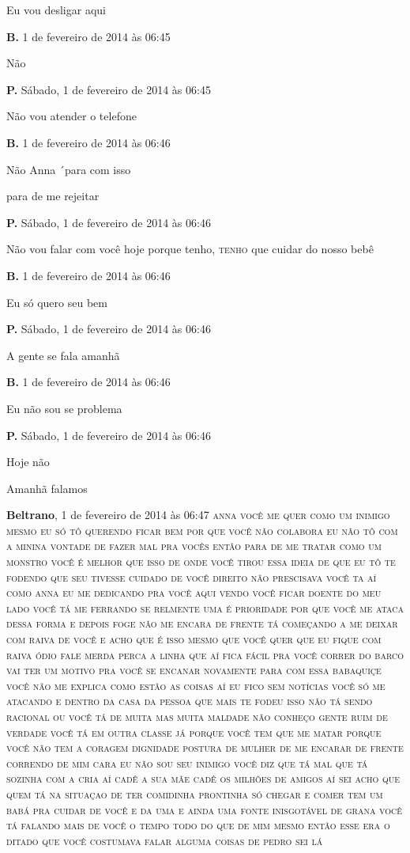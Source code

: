 Eu vou desligar aqui

\textbf{B.} 1 de fevereiro de 2014 às 06:45

Não

\textbf{P.} Sábado, 1 de fevereiro de 2014 às 06:45

Não vou atender o telefone

\textbf{B.} 1 de fevereiro de 2014 às 06:46

Não Anna ´para com isso

para de me rejeitar

\textbf{P.} Sábado, 1 de fevereiro de 2014 às 06:46

Não vou falar com você hoje porque tenho, \textsc{tenho} que cuidar do nosso bebê

\textbf{B.} 1 de fevereiro de 2014 às 06:46

Eu só quero seu bem

\textbf{P.} Sábado, 1 de fevereiro de 2014 às 06:46

A gente se fala amanhã

\textbf{B.} 1 de fevereiro de 2014 às 06:46

Eu não sou se problema

\textbf{P.} Sábado, 1 de fevereiro de 2014 às 06:46

Hoje não

Amanhã falamos

\textbf{Beltrano}, 1 de fevereiro de 2014 às 06:47 \textsc{anna você me quer
como um inimigo mesmo eu só tô querendo ficar bem por que você não
colabora eu não tô com a minina vontade de fazer mal pra vocês então
para de me tratar como um monstro você é melhor que isso de onde você
tirou essa ideia de que eu tô te fodendo que seu tivesse cuidado de você
direito não prescisava você ta aí como anna eu me dedicando pra você
aqui vendo você ficar doente do meu lado você tá me ferrando se relmente
uma é prioridade por que você me ataca dessa forma e depois foge não me
encara de frente tá começando a me deixar com raiva de você e acho que é
isso mesmo que você quer que eu fique com raiva ódio fale merda perca a
linha que aí fica fácil pra você correr do barco vai ter um motivo pra
você se encanar novamente para com essa babaquiçe você não me explica
como estão as coisas aí eu fico sem notícias você só me atacando e
dentro da casa da pessoa que mais te fodeu isso não tá sendo racional ou
você tá de muita mas muita maldade não conheço gente ruim de verdade
você tá em outra classe já porque você tem que me matar porque você não
tem a coragem dignidade postura de mulher de me encarar de frente
correndo de mim cara eu não sou seu inimigo você diz que tá mal que tá
sozinha com a cria aí cadê a sua mãe cadê os milhões de amigos aí sei
acho que quem tá na situaçao de ter comidinha prontinha só chegar e
comer tem um babá pra cuidar de você e da uma e ainda uma fonte
inisgotável de grana você tá falando mais de você o tempo todo do que de
mim mesmo então esse era o ditado que você costumava falar alguma coisas
de pedro sei lá}

